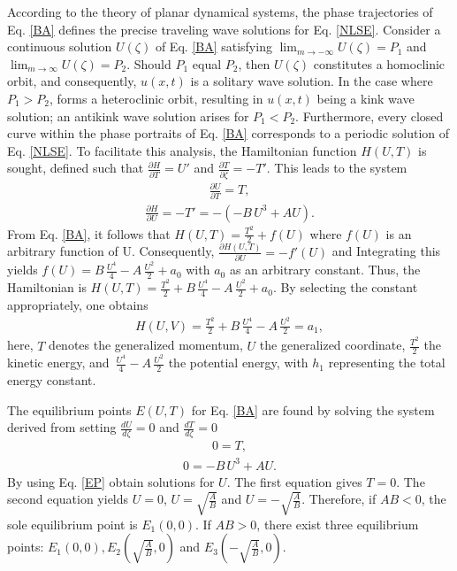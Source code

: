 \documentclass[10pt]{NSP1}
\numberwithin{equation}{section}
\begin{document}
According to the theory of planar dynamical systems, the phase trajectories of Eq. \ref{BA} defines the precise traveling wave solutions for Eq. \ref{NLSE}. Consider a continuous solution $U(\zeta)$ of Eq. \ref{BA} satisfying ${\lim_{m\longrightarrow-\infty}U(\zeta)=P_{1}}$ and ${\lim_{m\longrightarrow\infty}U(\zeta)=P_{2}}$. Should $P_{1}$ equal $P_{2}$, then $U(\zeta)$ constitutes a homoclinic orbit, and consequently, $u(x, t)$ is a solitary wave solution. In the case where $P_{1} > P_{2}$, forms a heteroclinic orbit, resulting in $u(x, t)$ being a kink wave solution; an antikink wave solution arises for $P_{1} < P_{2}$. Furthermore, every closed curve within the phase portraits of Eq. \ref{BA} corresponds to a periodic solution of Eq. \ref{NLSE}. To facilitate this analysis, the Hamiltonian function $H(U, T)$ is sought, defined such that $\frac{\partial H}{\partial T} = \mathit{U'}$ and $\frac{\partial T}{\partial \zeta} = -\mathit{T'}$. This leads to the system
\begin{eqnarray}
\frac{\partial U}{\partial T} = T,\nonumber
\end{eqnarray}
\begin{eqnarray}
\frac{\partial H}{\partial U} =-T'= -(-B \,U^{3}+A U).
\end{eqnarray}
From Eq. \ref{BA}, it follows that $H(U, T)=\frac{T^2}{2}+f(U)$ where $f(U)$ is an arbitrary function of U. Consequently, $\frac{\partial H(U,T)}{\partial U} =-f'(U)$ and Integrating this yields $f(U)=B\,\frac{U^4}{4}-A\,\frac{U^2}{2}+a_{0}$ with $a_{0}$ as an arbitrary constant. Thus, the Hamiltonian is $H(U, T) = \frac{T^2}{2}+B\,\frac{U^4}{4}-A\,\frac{U^2}{2}+a_{0}$. By selecting the constant appropriately, one obtains
\begin{eqnarray}
H(U, V) = \frac{T^2}{2}+B\,\frac{U^4}{4}-A\,\frac{U^2}{2}=a_{1},
\end{eqnarray}
here, $T$ denotes the generalized momentum, $U$ the generalized coordinate, $\frac{T^2}{2}$ the kinetic energy, and $\,\frac{U^4}{4}-A\,\frac{U^2}{2}$ the potential energy, with $h_{1}$ representing the total energy constant.

The equilibrium points $E(U, T)$ for Eq. \ref{BA} are found by solving the system derived from setting $\frac{d U}{d \zeta}= 0$ and $\frac{d T}{d \zeta} = 0$
\begin{eqnarray}\label{EP}
0 = T,\nonumber
\end{eqnarray}
\begin{eqnarray}
0 = -B \,U^{3}+A U.
\end{eqnarray}
By using Eq. \ref{EP} obtain solutions for $U$. The first equation gives $T = 0$. The second equation yields $U=0$, $U=\sqrt{\frac{A}{B}}$ and $U=-\sqrt{\frac{A}{B}}$. Therefore, if $AB < 0$, the sole equilibrium point is $E_{1}(0, 0)$. If $AB > 0$, there exist three equilibrium points: $E_{1}(0, 0), E_{2}(\sqrt{\frac{A}{B}},0)$ and $E_{3}(-\sqrt{\frac{A}{B}}, 0)$.
\end{document}
